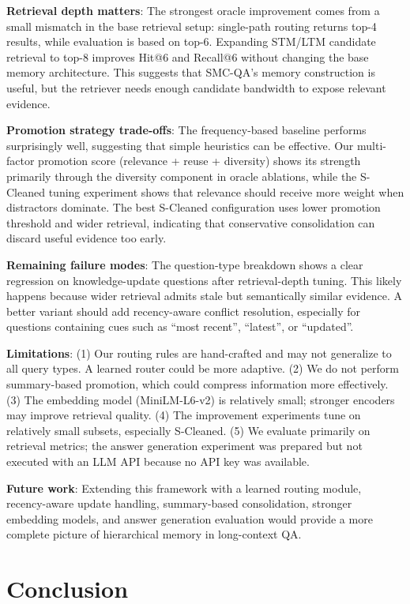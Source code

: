 \documentclass{article}
\begin{document}
\textbf{Retrieval depth matters}: The strongest oracle improvement comes from a small mismatch in the base retrieval setup: single-path routing returns top-4 results, while evaluation is based on top-6. Expanding STM/LTM candidate retrieval to top-8 improves Hit@6 and Recall@6 without changing the base memory architecture. This suggests that SMC-QA's memory construction is useful, but the retriever needs enough candidate bandwidth to expose relevant evidence.

\textbf{Promotion strategy trade-offs}: The frequency-based baseline performs surprisingly well, suggesting that simple heuristics can be effective. Our multi-factor promotion score (relevance + reuse + diversity) shows its strength primarily through the diversity component in oracle ablations, while the S-Cleaned tuning experiment shows that relevance should receive more weight when distractors dominate. The best S-Cleaned configuration uses lower promotion threshold and wider retrieval, indicating that conservative consolidation can discard useful evidence too early.

\textbf{Remaining failure modes}: The question-type breakdown shows a clear regression on knowledge-update questions after retrieval-depth tuning. This likely happens because wider retrieval admits stale but semantically similar evidence. A better variant should add recency-aware conflict resolution, especially for questions containing cues such as ``most recent'', ``latest'', or ``updated''.

\textbf{Limitations}: (1) Our routing rules are hand-crafted and may not generalize to all query types. A learned router could be more adaptive. (2) We do not perform summary-based promotion, which could compress information more effectively. (3) The embedding model (MiniLM-L6-v2) is relatively small; stronger encoders may improve retrieval quality. (4) The improvement experiments tune on relatively small subsets, especially S-Cleaned. (5) We evaluate primarily on retrieval metrics; the answer generation experiment was prepared but not executed with an LLM API because no API key was available.

\textbf{Future work}: Extending this framework with a learned routing module, recency-aware update handling, summary-based consolidation, stronger embedding models, and answer generation evaluation would provide a more complete picture of hierarchical memory in long-context QA.

\section{Conclusion}
\end{document}

